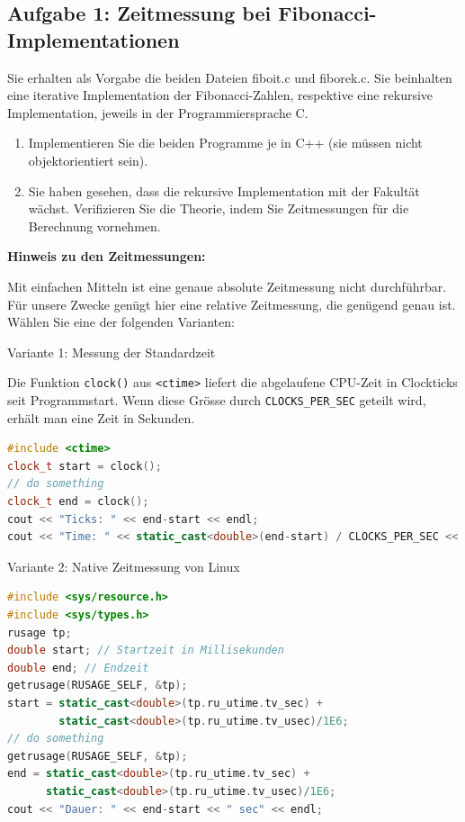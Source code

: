 \subsection{Aufgabe 1: Zeitmessung bei Fibonacci-Implementationen}
Sie erhalten als Vorgabe die beiden Dateien fiboit.c und fiborek.c. Sie beinhalten eine iterative Implementation
der Fibonacci-Zahlen, respektive eine rekursive Implementation, jeweils in der Programmiersprache
C.
\begin{enumerate}
  \item Implementieren Sie die beiden Programme je in C++ (sie müssen nicht objektorientiert sein).
  \item Sie haben gesehen, dass die rekursive Implementation mit der Fakultät wächst. Verifizieren Sie die Theorie, indem Sie Zeitmessungen für die Berechnung vornehmen.
\end{enumerate}

\textbf{Hinweis zu den Zeitmessungen:}

Mit einfachen Mitteln ist eine genaue absolute Zeitmessung nicht durchführbar. Für unsere Zwecke genügt
hier eine relative Zeitmessung, die genügend genau ist. Wählen Sie eine der folgenden Varianten:

Variante 1: Messung der Standardzeit

Die Funktion \texttt{clock()} aus \texttt{<ctime>} liefert die abgelaufene CPU-Zeit in Clockticks seit Programmstart. Wenn
diese Grösse durch \texttt{CLOCKS\_PER\_SEC} geteilt wird, erhält man eine Zeit in Sekunden.
\begin{lstlisting}[language=C++, style=C++]
#include <ctime>
clock_t start = clock();
// do something
clock_t end = clock();
cout << "Ticks: " << end-start << endl;
cout << "Time: " << static_cast<double>(end-start) / CLOCKS_PER_SEC << " sec" << endl;
\end{lstlisting}

Variante 2: Native Zeitmessung von Linux
\begin{lstlisting}[language=C++, style=C++]
#include <sys/resource.h>
#include <sys/types.h>
rusage tp;
double start; // Startzeit in Millisekunden
double end; // Endzeit
getrusage(RUSAGE_SELF, &tp);
start = static_cast<double>(tp.ru_utime.tv_sec) +
        static_cast<double>(tp.ru_utime.tv_usec)/1E6;
// do something
getrusage(RUSAGE_SELF, &tp);
end = static_cast<double>(tp.ru_utime.tv_sec) +
      static_cast<double>(tp.ru_utime.tv_usec)/1E6;
cout << "Dauer: " << end-start << " sec" << endl;
\end{lstlisting}

